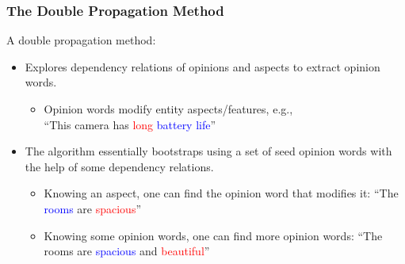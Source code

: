 \documentclass[t]{beamer}
\begin{document}

\begin{frame} \frametitle{The Double Propagation Method} %



A double propagation method:
\begin{itemize}
\item Explores dependency relations of opinions and aspects to
    extract opinion words.
  \begin{itemize}
    \item Opinion words modify entity aspects/features, e.g., \\
        ``This camera has \textcolor{red}{long} \textcolor{blue}{battery life}''
  \end{itemize}
   
\item The algorithm essentially bootstraps using a set of seed opinion
  words with the help of some dependency relations.
  \begin{itemize}
    \item Knowing an aspect, one can find the opinion word that
modifies it: ``The \textcolor{blue}{rooms} are
\textcolor{red}{spacious}''
    \item Knowing some opinion words, one can find more opinion words: ``The rooms are \textcolor{blue}{spacious} and \textcolor{red}{beautiful}''
  \end{itemize}
\end{itemize}

\end{frame}
\end{document}
